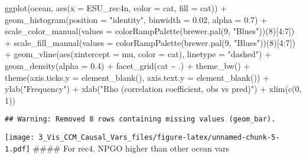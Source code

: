 \documentclass[
]{article}
\newenvironment{Shaded}{\begin{snugshade}}{\end{snugshade}}
\newcommand{\AttributeTok}[1]{\textcolor[rgb]{0.77,0.63,0.00}{#1}}
\newcommand{\DecValTok}[1]{\textcolor[rgb]{0.00,0.00,0.81}{#1}}
\newcommand{\FloatTok}[1]{\textcolor[rgb]{0.00,0.00,0.81}{#1}}
\newcommand{\FunctionTok}[1]{\textcolor[rgb]{0.00,0.00,0.00}{#1}}
\newcommand{\NormalTok}[1]{#1}
\newcommand{\SpecialCharTok}[1]{\textcolor[rgb]{0.00,0.00,0.00}{#1}}
\newcommand{\StringTok}[1]{\textcolor[rgb]{0.31,0.60,0.02}{#1}}
\begin{document}
\begin{Shaded}
\begin{Highlighting}[]
\FunctionTok{ggplot}\NormalTok{(ocean, }\FunctionTok{aes}\NormalTok{(}\AttributeTok{x =}\NormalTok{ ESU\_rec4n, }\AttributeTok{color =}\NormalTok{ cat, }\AttributeTok{fill =}\NormalTok{ cat)) }\SpecialCharTok{+} 
  \FunctionTok{geom\_histogram}\NormalTok{(}\AttributeTok{position =} \StringTok{"identity"}\NormalTok{, }\AttributeTok{binwidth =} \FloatTok{0.02}\NormalTok{, }\AttributeTok{alpha =} \FloatTok{0.7}\NormalTok{) }\SpecialCharTok{+}
  \FunctionTok{scale\_color\_manual}\NormalTok{(}\AttributeTok{values =} \FunctionTok{colorRampPalette}\NormalTok{(}\FunctionTok{brewer.pal}\NormalTok{(}\DecValTok{9}\NormalTok{, }\StringTok{"Blues"}\NormalTok{))(}\DecValTok{8}\NormalTok{)[}\DecValTok{4}\SpecialCharTok{:}\DecValTok{7}\NormalTok{]) }\SpecialCharTok{+}
  \FunctionTok{scale\_fill\_manual}\NormalTok{(}\AttributeTok{values =} \FunctionTok{colorRampPalette}\NormalTok{(}\FunctionTok{brewer.pal}\NormalTok{(}\DecValTok{9}\NormalTok{, }\StringTok{"Blues"}\NormalTok{))(}\DecValTok{8}\NormalTok{)[}\DecValTok{4}\SpecialCharTok{:}\DecValTok{7}\NormalTok{]) }\SpecialCharTok{+}
  \FunctionTok{geom\_vline}\NormalTok{(}\FunctionTok{aes}\NormalTok{(}\AttributeTok{xintercept =}\NormalTok{ mu, }\AttributeTok{color =}\NormalTok{ cat),}
             \AttributeTok{linetype =} \StringTok{"dashed"}\NormalTok{) }\SpecialCharTok{+}
  \FunctionTok{geom\_density}\NormalTok{(}\AttributeTok{alpha =} \FloatTok{0.4}\NormalTok{) }\SpecialCharTok{+} \FunctionTok{facet\_grid}\NormalTok{(cat }\SpecialCharTok{\textasciitilde{}}\NormalTok{ .) }\SpecialCharTok{+}
  \FunctionTok{theme\_bw}\NormalTok{() }\SpecialCharTok{+}
  \FunctionTok{theme}\NormalTok{(}\AttributeTok{axis.ticks.y =} \FunctionTok{element\_blank}\NormalTok{(),}
        \AttributeTok{axis.text.y =} \FunctionTok{element\_blank}\NormalTok{()) }\SpecialCharTok{+}
  \FunctionTok{ylab}\NormalTok{(}\StringTok{"Frequency"}\NormalTok{) }\SpecialCharTok{+} \FunctionTok{xlab}\NormalTok{(}\StringTok{"Rho (correlation coefficient, obs vs pred)"}\NormalTok{) }\SpecialCharTok{+}
  \FunctionTok{xlim}\NormalTok{(}\FunctionTok{c}\NormalTok{(}\DecValTok{0}\NormalTok{, }\DecValTok{1}\NormalTok{))}
\end{Highlighting}
\end{Shaded}

\begin{verbatim}
## Warning: Removed 8 rows containing missing values (geom_bar).
\end{verbatim}

\texttt{[image: 3\_Vis\_CCM\_Causal\_Vars\_files/figure-latex/unnamed-chunk-5-1.pdf]}
\#\#\#\# For rec4, NPGO higher than other ocean vars
\end{document}
